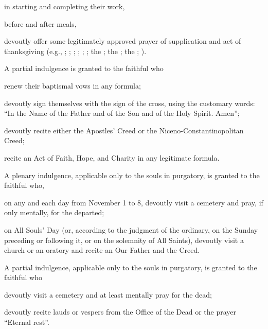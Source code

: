  in starting and completing their work,

 before and after meals,

devoutly offer some legitimately approved prayer of supplication and act of thanksgiving (e.g., ; ; ; ; ; ; the ; the ; the ; ).

\hypertarget{grant28}{}
 A partial indulgence is granted to the faithful who

 renew their baptismal vows in any formula;

 devoutly sign themselves with the sign of the cross, using the customary words: ``In the Name of the Father and of the Son and of the Holy Spirit. Amen'';

 devoutly recite either the Apostles' Creed or the Niceno-Constantinopolitan Creed;

 recite an Act of Faith, Hope, and Charity in any legitimate formula.

\hypertarget{grant29}{}
 A plenary indulgence, applicable only to the souls in purgatory, is granted to the faithful who,

 on any and each day from November 1 to 8, devoutly visit a cemetery and pray, if only mentally, for the departed;

 on All Souls' Day (or, according to the judgment of the ordinary, on the Sunday preceding or following it, or on the solemnity of All Saints), devoutly visit a church or an oratory and recite an Our Father and the Creed.

 A partial indulgence, applicable only to the souls in purgatory, is granted to the faithful who

 devoutly visit a cemetery and at least mentally pray for the dead;

 devoutly recite lauds or vespers from the Office of the Dead or the prayer ``Eternal rest''.

\newpage